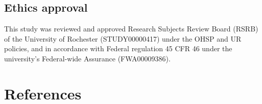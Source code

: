 \documentclass[preprint]{JASA}
\begin{document}
\subsection*{Ethics approval}\label{ethics-approval}

This study was reviewed and approved Research Subjects Review Board (RSRB) of the University of Rochester (STUDY00000417) under the OHSP and UR policies, and in accordance with Federal regulation 45 CFR 46 under the university's Federal-wide Assurance (FWA00009386).

\newpage{}

\section{References}\label{sec:references}

\begingroup
\setlength{\parindent}{-0.5in}
\setlength{\leftskip}{0.5in}

\nocite{balzano1982}
\nocite{barreda-nearey2018}
\nocite{goldinger1996}
\nocite{hay2017}
\nocite{hay2019}
\nocite{johnson1999}
\nocite{kleinschmidt-jaeger2016}
\nocite{mcgowan2015}
\nocite{shankweiler1978}
\nocite{shannon1948}
\nocite{strange-jenkins2012}
\nocite{sumner2011}
\nocite{walker-hay2011}
\nocite{zwicker1957}
\nocite{zwicker-terhardt1980}

\endgroup









\end{document}
